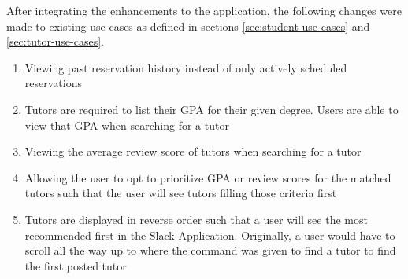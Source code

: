 After integrating the enhancements to the application, the following
changes were made to existing use cases as defined in sections
\ref{sec:student-use-cases} and \ref{sec:tutor-use-cases}.

\begin{enumerate}
  \item Viewing past reservation history instead of only actively scheduled
reservations
  \item Tutors are required to list their GPA for their given degree. Users
are able to view that GPA when searching for a tutor
  \item Viewing the average review score of tutors when searching for a tutor
  \item  Allowing the user to opt to prioritize GPA or review scores for the 
matched tutors such that the user will see tutors filling those criteria first
  \item Tutors are displayed in reverse order such that a user will see the most 
recommended first in the Slack Application. Originally, a user would have to 
scroll all the way up to where the command was given to find a tutor to find 
the first posted tutor
\end{enumerate}




